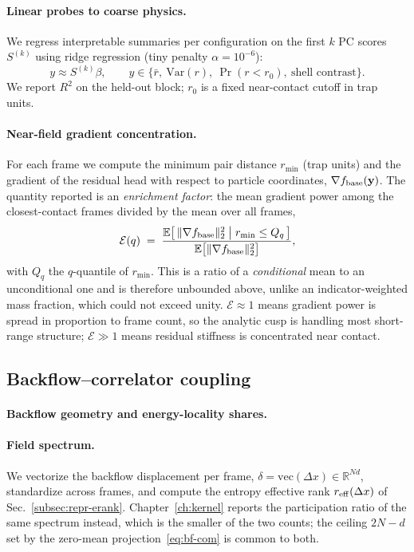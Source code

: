 \paragraph{Linear probes to coarse physics.}
\label{subsec:repr-probes}
We regress interpretable summaries per configuration on the first $k$ PC scores $S^{(k)}$ using
ridge regression (tiny penalty $\alpha=10^{-6}$):
\[
y \approx S^{(k)} \beta,\qquad 
y\in\big\{\bar r,\ \mathrm{Var}(r),\ \Pr(r<r_0),\ \text{shell\ contrast}\big\}.
\]
We report $R^2$ on the held-out block; $r_0$ is a fixed near-contact cutoff in trap units.

\paragraph{Near-field gradient concentration.}
\label{subsec:repr-nearfield}
For each frame we compute the minimum pair distance $r_{\min}$ (trap units) and the gradient
of the residual head with respect to particle coordinates, $\nabla f_{\rm base}(\mathbf{y})$.
The quantity reported is an \emph{enrichment factor}: the mean gradient power among the
closest-contact frames divided by the mean over all frames,
\begin{equation}
\mathcal{E}(q)\;=\;
\frac{\mathbb{E}\big[\,\|\nabla f_{\rm base}\|_2^2 \;\big|\; r_{\min}\le Q_q\,\big]}
     {\mathbb{E}\big[\|\nabla f_{\rm base}\|_2^2\big]},
\label{eq:nf-enrichment}
\end{equation}
with $Q_q$ the $q$-quantile of $r_{\min}$. This is a ratio of a \emph{conditional} mean to an
unconditional one and is therefore unbounded above, unlike an indicator-weighted mass
fraction, which could not exceed unity. $\mathcal{E}\approx1$ means gradient power is spread
in proportion to frame count, so the analytic cusp is handling most short-range structure;
$\mathcal{E}\gg1$ means residual stiffness is concentrated near contact.

\subsection{Backflow--correlator coupling}
\paragraph{Backflow geometry and energy-locality shares.}
\label{subsec:repr-bf}

\paragraph{Field spectrum.}
We vectorize the backflow displacement per frame,
$\delta=\mathrm{vec}(\Delta x)\in\mathbb{R}^{Nd}$, standardize across frames,
and compute the entropy effective rank $r_{\rm eff}(\Delta x)$ of
Sec.~\ref{subsec:repr-erank}. Chapter~\ref{ch:kernel} reports the participation ratio of
the same spectrum instead, which is the smaller of the two counts; the ceiling
$2N-d$ set by the zero-mean projection~\eqref{eq:bf-com} is common to both.

